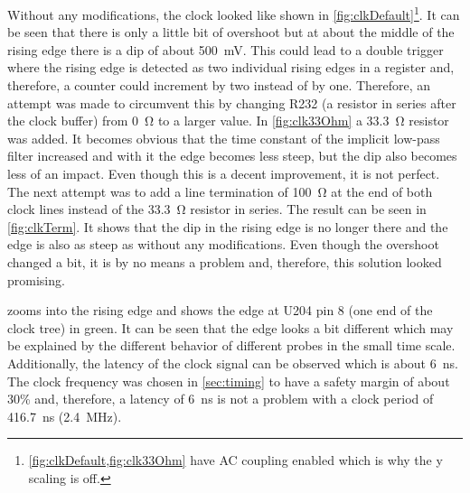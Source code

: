 Without any modifications, the clock looked like shown in \cref{fig:clkDefault}\footnote{\cref{fig:clkDefault,fig:clk33Ohm} have AC coupling enabled which is why the y scaling is off.}.
It can be seen that there is only a little bit of overshoot but at about the middle of the rising edge there is a dip of about \qty{500}{\milli\volt}.
This could lead to a double trigger where the rising edge is detected as two individual rising edges in a register and, therefore, a counter could increment by two instead of by one.
Therefore, an attempt was made to circumvent this by changing R232 (a resistor in series after the clock buffer) from \qty{0}{\ohm} to a larger value.
In \cref{fig:clk33Ohm} a \qty{33.3}{\ohm} resistor was added.
It becomes obvious that the time constant of the implicit low-pass filter increased and with it the edge becomes less steep, but the dip also becomes less of an impact.
Even though this is a decent improvement, it is not perfect.
The next attempt was to add a line termination of \qty{100}{\ohm} at the end of both clock lines instead of the \qty{33.3}{\ohm} resistor in series.
The result can be seen in \cref{fig:clkTerm}.
It shows that the dip in the rising edge is no longer there and the edge is also as steep as without any modifications.
Even though the overshoot changed a bit, it is by no means a problem and, therefore, this solution looked promising.

 zooms into the rising edge and shows the edge at U204 pin 8 (one end of the clock tree) in green.
It can be seen that the edge looks a bit different which may be explained by the different behavior of different probes in the small time scale.
Additionally, the latency of the clock signal can be observed which is about \qty{6}{\nano\second}.
The clock frequency was chosen in \cref{sec:timing} to have a safety margin of about 30\% and, therefore, a latency of \qty{6}{\nano\second} is not a problem with a clock period of \qty{416.7}{\nano\second} (\qty{2.4}{\mega\hertz}).


